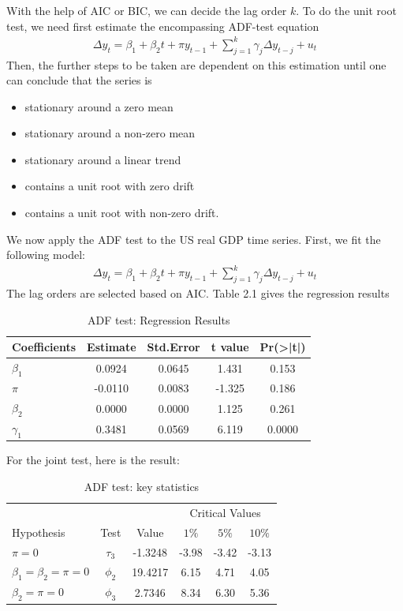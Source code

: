 \documentclass[12pt]{article}
\theoremstyle{definition}
\numberwithin{equation}{section}
\numberwithin{figure}{section}
\numberwithin{table}{section}
\begin{document}
With the help of AIC or BIC, we can decide the lag order $k$. To do the unit root test, we need first estimate the encompassing ADF-test equation
\begin{align}
  \Delta y_t = \beta_1 + \beta_2 t + \pi y_{t-1} + \sum_{j=1}^k \gamma_j \Delta y_{t-j} + u_t
\end{align}
Then, the further steps to be taken are dependent on this estimation until one can conclude that the series is
\begin{itemize}
  \item stationary around a zero mean
  \item stationary around a non-zero mean
  \item stationary around a linear trend
  \item contains a unit root with zero drift
  \item contains a unit root with non-zero drift.
\end{itemize}

We now apply the ADF test to the US real GDP time series. First, we fit the following model:
\begin{align*}
  \Delta y_t = \beta_1 + \beta_2 t + \pi y_{t-1} + \sum_{j=1}^k \gamma_j \Delta y_{t-j} + u_t
\end{align*}
The lag orders are selected based on AIC. Table 2.1 gives the regression results
\begin{table}[H]
  \centering
  \renewcommand{\arraystretch}{1.2}
  \caption{ADF test: Regression Results}
  \begin{tabular}{lcccc}
    \hline
    \hline
    Coefficients & Estimate & Std.Error & t value & Pr(>|t|) \\
    \hline
    $\beta_1$ & 0.0924 & 0.0645 & 1.431 & 0.153 \\
    $\pi$ & -0.0110 & 0.0083 & -1.325 & 0.186 \\
    $\beta_2$ & 0.0000 & 0.0000& 1.125 & 0.261 \\
    $\gamma_1$ & 0.3481 & 0.0569 & 6.119 & 0.0000 \\
    \hline
    \end{tabular}
\end{table}

For the joint test, here is the result:
\begin{table}[H]
  \renewcommand{\arraystretch}{1.2}
  \centering
  \caption{ADF test: key statistics}
  \begin{tabular}{lccccc}
    \hline
    \hline
    & & &  \multicolumn{3}{c}{Critical Values} \\
    \cline{4-6}
    Hypothesis & Test &  Value & $1\%$ & $5\%$ & $10\%$ \\
    $\pi = 0$ & $\tau_3$ & -1.3248 & -3.98 & -3.42 & -3.13 \\
    $\beta_1 = \beta_2 = \pi = 0$ & $\phi_2$ & 19.4217 & 6.15 & 4.71 & 4.05 \\
    $\beta_2 = \pi = 0$ & $\phi_3$ & 2.7346 & 8.34 &  6.30 &  5.36 \\
    \hline
  \end{tabular}
\end{table}
\end{document}
